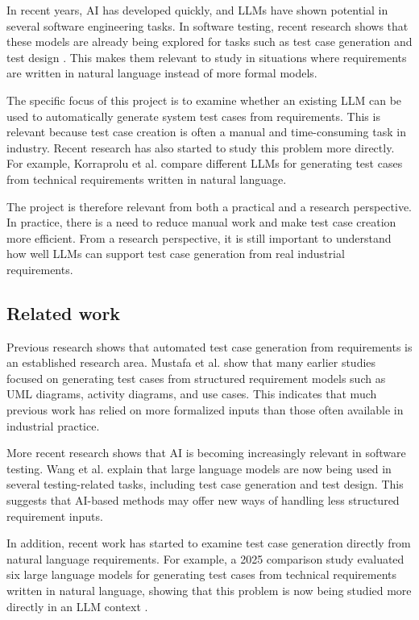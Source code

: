 \documentclass[a4paper,12pt]{article}
\begin{document}
In recent years, AI has developed quickly, and LLMs have shown potential in several software engineering tasks. In software testing, recent research shows that these models are already being explored for tasks such as test case generation and test design \cite{wang2024software}. This makes them relevant to study in situations where requirements are written in natural language instead of more formal models.

The specific focus of this project is to examine whether an existing LLM can be used to automatically generate system test cases from requirements. This is relevant because test case creation is often a manual and time-consuming task in industry. Recent research has also started to study this problem more directly. For example, Korraprolu et al. \cite{korraprolu2025test} compare different LLMs for generating test cases from technical requirements written in natural language.

The project is therefore relevant from both a practical and a research perspective. In practice, there is a need to reduce manual work and make test case creation more efficient. From a research perspective, it is still important to understand how well LLMs can support test case generation from real industrial requirements.


\subsection{Related work}

Previous research shows that automated test case generation from requirements is an established research area. Mustafa et al. \cite{mustafa2021automated} show that many earlier studies focused on generating test cases from structured requirement models such as UML diagrams, activity diagrams, and use cases. This indicates that much previous work has relied on more formalized inputs than those often available in industrial practice.

More recent research shows that AI is becoming increasingly relevant in software testing. Wang et al. \cite{wang2024software} explain that large language models are now being used in several testing-related tasks, including test case generation and test design. This suggests that AI-based methods may offer new ways of handling less structured requirement inputs.

In addition, recent work has started to examine test case generation directly from natural language requirements. For example, a 2025 comparison study evaluated six large language models for generating test cases from technical requirements written in natural language, showing that this problem is now being studied more directly in an LLM context \cite{korraprolu2025test}.
\end{document}
